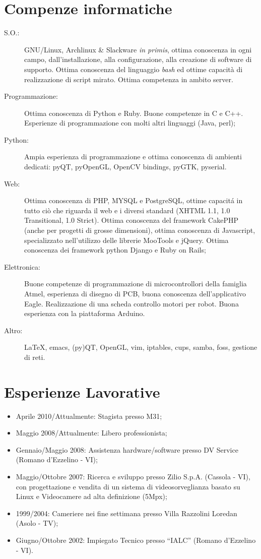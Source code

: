 \documentclass[pdftex, a4paper, 11pt]{article}
\begin{document}
\section*{Compenze informatiche}
\begin{description}
\item[S.O.:] GNU/Linux, Archlinux \& Slackware {\em in primis}, ottima conoscenza
  in ogni campo, dall'installazione, alla configurazione, alla
  creazione di software di supporto. Ottima conoscenza del linguaggio
  {\em bash} ed ottime capacit\`a di realizzazione di script
  mirato. Ottima competenza in ambito server.
\item[Programmazione:] Ottima conoscenza di Python e Ruby. Buone competenze in C e C++. 
  Esperienze di programmazione con molti altri linguaggi (Java, perl);
\item[Python:] Ampia esperienza di programmazione e ottima conoscenza
  di ambienti dedicati: pyQT, pyOpenGL, OpenCV bindings, pyGTK,
  pyserial.
\item[Web:] Ottima conoscenza di PHP, MYSQL e PostgreSQL, ottime capacit\'a in
  tutto ci\`o che riguarda il web e i diversi standard (XHTML 1.1,
  1.0 Transitional, 1.0 Strict). Ottima conoscenza del framework
  CakePHP (anche per progetti di grosse dimensioni), ottima conoscenza
  di Javascript, specializzato nell'utilizzo delle librerie MooTools e jQuery.
  Ottima conoscenza dei framework python Django e  Ruby on Rails;
\item[Elettronica:] Buone competenze di programmazione di
  microcontrollori della famiglia Atmel, esperienza di disegno di PCB,
  buona conoscenza dell'applicativo Eagle. Realizzazione di una scheda
  controllo motori per robot. Buona esperienza con la piattaforma Arduino.
\item[Altro:] \LaTeX, emacs, (py)QT, OpenGL, vim, iptables, cups,
  samba, foss, gestione di reti.
\end{description}

\section*{Esperienze Lavorative}
\begin{itemize}
\item Aprile 2010/Attualmente: Stagista presso M31;
\item Maggio 2008/Attualmente: Libero professionista;
\item Gennaio/Maggio 2008: Assistenza hardware/software presso DV
  Service (Romano d'Ezzelino - VI);
\item Maggio/Ottobre 2007: Ricerca e sviluppo presso Zilio
  S.p.A. (Cassola - VI), con progettazione e vendita di un sistema di
  videosorveglianza basato su Linux e Videocamere ad alta definizione
  (5Mpx);
\item 1999/2004: Cameriere nei fine settimana presso Villa Razzolini
  Loredan (Asolo - TV);
\item Giugno/Ottobre 2002: Impiegato Tecnico presso ``IALC'' (Romano
  d'Ezzelino - VI).
\end{itemize}
\end{document}
